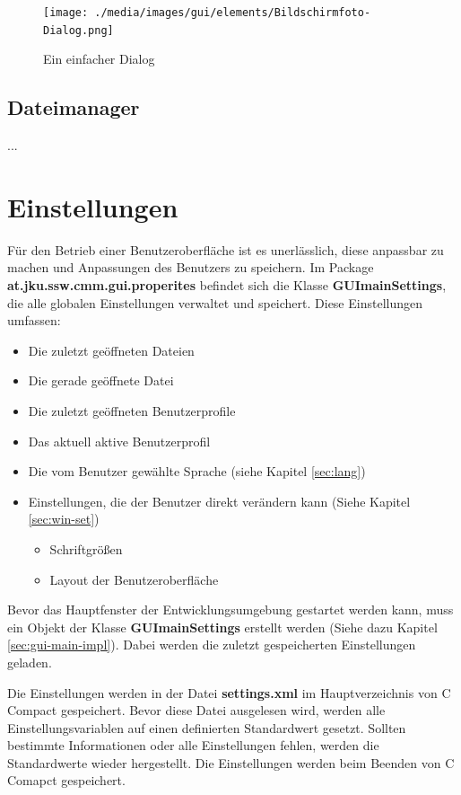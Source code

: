 \begin{figure}[htp]
\centering
\texttt{[image: ./media/images/gui/elements/Bildschirmfoto-Dialog.png]}
\caption{Ein einfacher Dialog}
\label{fig:win-dialog}
\end{figure}

\subsection{Dateimanager}
...

\section{Einstellungen}
\label{sec:guimainsettings}
Für den Betrieb einer Benutzeroberfläche ist es unerlässlich, diese anpassbar zu machen und Anpassungen des Benutzers zu speichern. Im Package \textbf{at.jku.ssw.cmm.gui.properites} befindet sich die Klasse \textbf{GUImainSettings}, die alle globalen Einstellungen verwaltet und speichert. Diese Einstellungen umfassen:
\begin{itemize}
\item Die zuletzt geöffneten Dateien
\item Die gerade geöffnete Datei
\item Die zuletzt geöffneten Benutzerprofile
\item Das aktuell aktive Benutzerprofil
\item Die vom Benutzer gewählte Sprache (siehe Kapitel \ref{sec:lang})
\item Einstellungen, die der Benutzer direkt verändern kann (Siehe Kapitel \ref{sec:win-set})
\begin{itemize}
\item Schriftgrößen
\item Layout der Benutzeroberfläche
\end{itemize}
\end{itemize}

Bevor das Hauptfenster der Entwicklungsumgebung gestartet werden kann, muss ein Objekt der Klasse \textbf{GUImainSettings} erstellt werden (Siehe dazu Kapitel \ref{sec:gui-main-impl}). Dabei werden die zuletzt gespeicherten Einstellungen geladen.

Die Einstellungen werden in der Datei \textbf{settings.xml} im Hauptverzeichnis von C Compact gespeichert. Bevor diese Datei ausgelesen wird, werden alle Einstellungsvariablen auf einen definierten Standardwert gesetzt. Sollten bestimmte Informationen oder alle Einstellungen fehlen, werden die Standardwerte wieder hergestellt. Die Einstellungen werden beim Beenden von C Comapct gespeichert.

